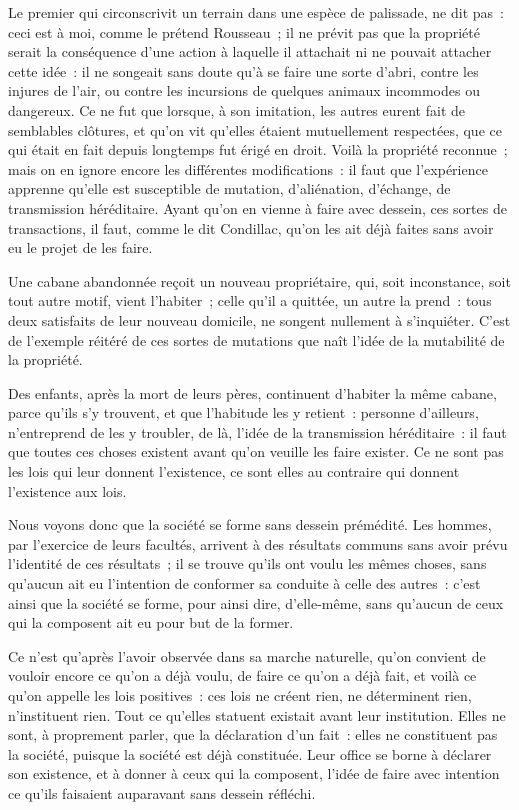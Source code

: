 \documentclass[french,twoside]{book} %
\begin{document}
Le premier qui circonscrivit un terrain dans une espèce de palissade, ne dit pas : ceci est à moi, comme le prétend Rousseau ; il ne prévit pas que la propriété serait la conséquence d’une action à laquelle il attachait ni ne pouvait attacher cette idée : il ne songeait sans doute qu’à se faire une sorte d’abri, contre les injures de l’air, ou contre les incursions de quelques animaux incommodes ou dangereux. Ce ne fut que lorsque, à son imitation, les autres eurent fait de semblables clôtures, et qu’on vit qu’elles étaient mutuellement respectées, que ce qui était en fait depuis longtemps fut érigé en droit. Voilà la propriété reconnue ; mais on en ignore encore les différentes modifications : il faut que l’expérience apprenne qu’elle est susceptible de mutation, d’aliénation, d’échange, de transmission héréditaire. Ayant qu’on en vienne à faire avec dessein, ces sortes de transactions, il faut, comme le dit Condillac, qu’on les ait déjà faites sans avoir eu le projet de les faire.\par
Une cabane abandonnée reçoit un nouveau propriétaire, qui, soit inconstance, soit tout autre motif, vient l’habiter ; celle qu’il a quittée, un autre la prend : tous deux satisfaits de leur nouveau domicile, ne songent nullement à s’inquiéter. C’est de l’exemple réitéré de ces sortes de mutations que naît l’idée de la mutabilité de la propriété.\par
Des enfants, après la mort de leurs pères, continuent d’habiter la même cabane, parce qu’ils s’y trouvent, et que l’habitude les y retient : personne d’ailleurs, n’entreprend de les y troubler, de là, l’idée de la transmission héréditaire : il faut que toutes ces choses existent avant qu’on veuille les faire exister. Ce ne sont pas les lois qui leur donnent l’existence, ce sont elles au contraire qui donnent l’existence aux lois.\par
Nous voyons donc que la société se forme sans dessein prémédité. Les hommes, par l’exercice de leurs facultés, arrivent à des résultats communs sans avoir prévu l’identité de ces résultats ; il se trouve qu’ils ont voulu les mêmes choses, sans qu’aucun ait eu l’intention de conformer sa conduite à celle des autres : c’est ainsi que la société se forme, pour ainsi dire, d’elle-même, sans qu’aucun de ceux qui la composent ait eu pour but de la former.\par
Ce n’est qu’après l’avoir observée dans sa marche naturelle, qu’on convient de vouloir encore ce qu’on a déjà voulu, de faire ce qu’on a déjà fait, et voilà ce qu’on appelle les lois positives : ces lois ne créent rien, ne déterminent rien, n’instituent rien. Tout ce qu’elles statuent existait avant leur institution. Elles ne sont, à proprement parler, que la déclaration d’un fait : elles ne constituent pas la société, puisque la société est déjà constituée. Leur office se borne à déclarer son existence, et à donner à ceux qui la composent, l’idée de faire avec intention ce qu’ils faisaient auparavant sans dessein réfléchi.\par
\end{document}
